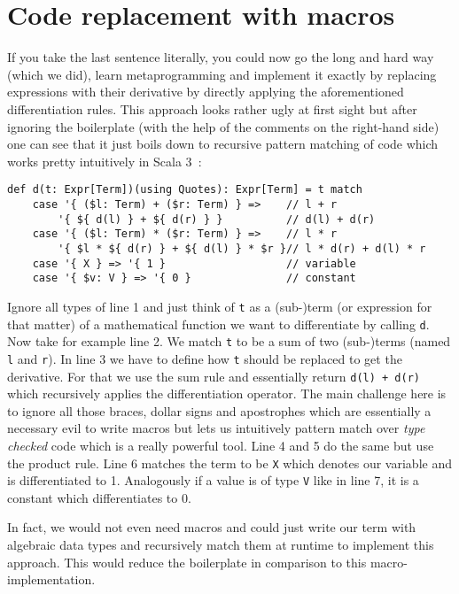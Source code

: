 \section{Code replacement with macros} \label{sec:macros}
If you take the last sentence literally, you could now go the long and hard way (which we did), learn metaprogramming and implement it exactly by replacing expressions with their derivative by directly applying the aforementioned differentiation rules. This approach looks rather ugly at first sight but after ignoring the boilerplate (with the help of the comments on the right-hand side) one can see that it just boils down to recursive pattern matching of code which works pretty intuitively in Scala 3~\cite{maScala3}:
\pagebreak
\begin{lstlisting}
def d(t: Expr[Term])(using Quotes): Expr[Term] = t match
    case '{ ($l: Term) + ($r: Term) } =>    // l + r
        '{ ${ d(l) } + ${ d(r) } }          // d(l) + d(r)
    case '{ ($l: Term) * ($r: Term) } =>    // l * r
        '{ $l * ${ d(r) } + ${ d(l) } * $r }// l * d(r) + d(l) * r
    case '{ X } => '{ 1 }                   // variable
    case '{ $v: V } => '{ 0 }               // constant
\end{lstlisting}
 Ignore all types of line 1 and just think of \lstinline{t} as a (sub-)term (or expression for that matter) of a mathematical function we want to differentiate by calling \lstinline{d}. Now take for example line 2. We match \lstinline{t} to be a sum of two (sub-)terms (named \lstinline{l} and \lstinline{r}). In line 3 we have to define how \lstinline{t} should be replaced to get the derivative. For that we use the sum rule and essentially return \lstinline{d(l) + d(r)} which recursively applies the differentiation operator. The main challenge here is to ignore all those braces, dollar signs and apostrophes which are essentially a necessary evil to write macros but lets us intuitively pattern match over \emph{type checked} code which is a really powerful tool. Line 4 and 5 do the same but use the product rule. Line 6 matches the term to be \lstinline{X} which denotes our variable and is differentiated to 1. Analogously if a value is of type \lstinline{V} like in line 7, it is a constant which differentiates to 0.

In fact, we would not even need macros and could just write our term with algebraic data types and recursively match them at runtime to implement this approach. This would reduce the boilerplate in comparison to this macro-implementation.


